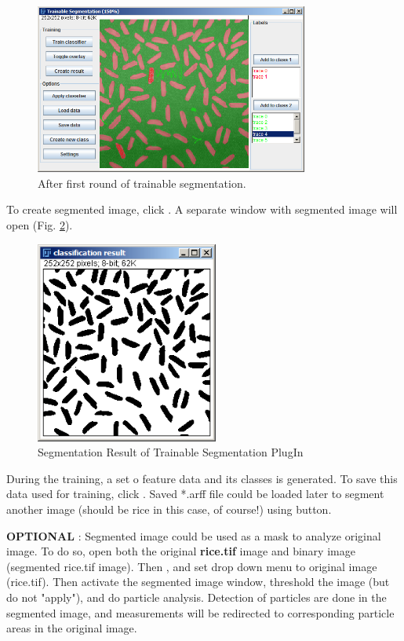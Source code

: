 \begin{indentexercise}{1}
\begin{figure}[htbp]
\begin{center}
\includegraphics[width=9cm]{fig/CMCIBasicCourse201102-img123.png}
\caption{ After first round of trainable segmentation.}
\label{fig:img123}
\end{center}
\end{figure}

To create segmented image, click . 
A separate window with segmented image will open (Fig. \ref{fig:img124}). 

\begin{figure}[htbp]
\begin{center}
\includegraphics[width=6cm]{fig/CMCIBasicCourse201102-img124.png}
\caption{ Segmentation Result of Trainable Segmentation PlugIn}
\label{fig:img124}
\end{center}
\end{figure}

During the training, a set o feature data and its classes is generated. To save this data used for training, click . Saved *.arff file could be loaded later to segment another image 
(should be rice in this case, of course!) using  button.

\textbf{OPTIONAL} : Segmented image could be used as a mask to analyze original image. 
To do so, open both the original \textbf{rice.tif} image and binary image (segmented rice.tif image).
Then , and set  drop down menu to
original image (rice.tif). Then activate the segmented image window, threshold the image (but do not
"apply"), and do particle analysis. 
Detection of particles are done in the segmented image, and
measurements will be redirected to corresponding particle areas in the
original image.  
\end{indentexercise}

